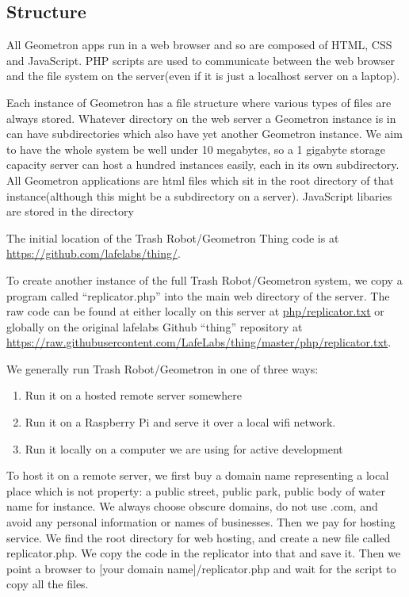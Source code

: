 \subsection{Structure}

All Geometron apps run in a web browser and so are composed of HTML, CSS and JavaScript.  PHP scripts are used to communicate between the web browser and the file system on the server(even if it is just a localhost server on a laptop).  

Each instance of Geometron has a file structure where various types of files are always stored.  Whatever directory on the web server a Geometron instance is in can have subdirectories which also have yet another Geometron instance. We aim to have the whole system be well under 10 megabytes, so a 1 gigabyte storage capacity server can host a hundred instances easily, each in its own subdirectory.  All Geometron applications are html files which sit in the root directory of that instance(although this might be a subdirectory on a server).  JavaScript libaries are stored in the directory 



The initial location of the Trash Robot/Geometron Thing code is at
\url{https://github.com/lafelabs/thing/}.

To create another instance of the full Trash Robot/Geometron system, we
copy a program called ``replicator.php'' into the main web directory of
the server. The raw code can be found at either locally on this server
at \url{php/replicator.txt} or globally on the original lafelabs Github
``thing'' repository at
\url{https://raw.githubusercontent.com/LafeLabs/thing/master/php/replicator.txt}.

We generally run Trash Robot/Geometron in one of three ways:

\begin{enumerate}
\def\labelenumi{\arabic{enumi}.}
\tightlist
\item
  Run it on a hosted remote server somewhere
\item
  Run it on a Raspberry Pi and serve it over a local wifi network.
\item
  Run it locally on a computer we are using for active development
\end{enumerate}

To host it on a remote server, we first buy a domain name representing a
local place which is not property: a public street, public park, public
body of water name for instance. We always choose obscure domains, do
not use .com, and avoid any personal information or names of businesses.
Then we pay for hosting service. We find the root directory for web
hosting, and create a new file called replicator.php. We copy the code
in the replicator into that and save it. Then we point a browser to
{[}your domain name{]}/replicator.php and wait for the script to copy
all the files.


